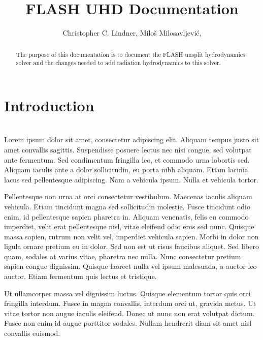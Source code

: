 \documentclass[twocolumn]{emulateapj}
\begin{document}
	

\title{FLASH UHD Documentation}
\author{
Christopher C. Lindner,
Milo\v s Milosavljevi\'c,
}


\begin{abstract}
The purpose of this documentation is to document the FLASH unsplit hydrodynamics solver and the changes needed to add radiation hydrodynamics to this solver.

\keywords{ }


\end{abstract}

\section{Introduction}
\label{sec:intro}
\setcounter{footnote}{0} \\

Lorem ipsum dolor sit amet, consectetur adipiscing elit. Aliquam tempus justo sit amet convallis sagittis. Suspendisse posuere lectus nec nisi congue, sed volutpat ante fermentum. Sed condimentum fringilla leo, et commodo urna lobortis sed. Aliquam iaculis ante a dolor sollicitudin, eu porta nibh aliquam. Etiam lacinia lacus sed pellentesque adipiscing. Nam a vehicula ipsum. Nulla et vehicula tortor.

Pellentesque non urna at orci consectetur vestibulum. Maecenas iaculis aliquam vehicula. Etiam tincidunt magna sed sollicitudin molestie. Fusce tincidunt odio enim, id pellentesque sapien pharetra in. Aliquam venenatis, felis eu commodo imperdiet, velit erat pellentesque nisl, vitae eleifend odio eros sed nunc. Quisque massa sapien, rutrum non velit vel, imperdiet vehicula sapien. Morbi in dolor non ligula ornare pretium eu in dolor. Sed non est ut risus faucibus aliquet. Sed libero quam, sodales at varius vitae, pharetra nec nulla. Nunc consectetur pretium sapien congue dignissim. Quisque laoreet nulla vel ipsum malesuada, a auctor leo auctor. Etiam fermentum quis lectus et tristique.

Ut ullamcorper massa vel dignissim luctus. Quisque elementum tortor quis orci fringilla interdum. Fusce in magna convallis, interdum orci ut, gravida metus. Ut vitae tortor non augue iaculis eleifend. Donec ut nunc non erat volutpat dictum. Fusce non enim id augue porttitor sodales. Nullam hendrerit diam sit amet nisl convallis euismod.
\end{document}
